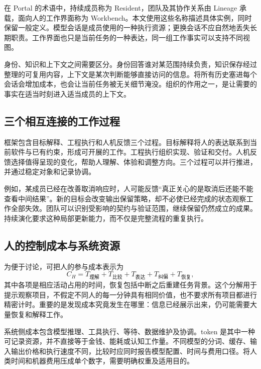 在 Portal 的术语中，持续成员称为 Resident，团队及其协作关系由 Lineage 承载，面向人的工作界面称为 Workbench。本文使用这些名称描述具体实例，同时保留一般定义。模型会话是成员使用的一种执行资源；更换会话不应自然地丢失长期职责。工作界面也只是当前任务的一种表达，同一组工作事实可以支持不同视图。

身份、知识和上下文之间需要区分。身份回答谁对某范围持续负责，知识保存经过整理的可复用内容，上下文是某次判断能够直接访问的信息。将所有历史塞进每个会话会增加成本，也会让当前任务被无关细节淹没。组织的作用之一，是让需要的事实在适当时刻进入适当成员的上下文。

\subsection{三个相互连接的工作过程}
框架包含目标解释、工程执行和人机反馈三个过程。目标解释将人的表达联系到当前软件与已有约束，形成可开展的工作。工程执行组织实现、验证和交付。人机反馈选择值得呈现的变化，帮助人理解、体验和调整方向。三个过程可以并行推进，并通过稳定对象和记录协调。

例如，某成员已经在改善取消响应时，人可能反馈“真正关心的是取消后还能不能查看中间结果”。新的目标会改变输出保留策略，却不必使已经完成的状态观察工作全部失效。团队可以识别受影响的契约与验证范围，继续保留仍然成立的成果。持续演化要求这种局部更新能力，而不仅是完整流程的重复执行。


\subsection{人的控制成本与系统资源}
为便于讨论，可把人的参与成本表示为
\begin{equation}
 C_H = T_{\text{理解}}+T_{\text{比较}}+T_{\text{表达}}+T_{\text{纠偏}}+T_{\text{恢复}},
\end{equation}
其中各项是相应活动占用的时间，恢复包括中断之后重建任务背景。这个分解用于提示观察项目，不假定不同人的每一分钟具有相同价值，也不要求所有项目都进行精密计时。重要的是发现成本究竟发生在哪里：信息已经展示出来，仍可能需要大量恢复和解释工作。

系统侧成本包含模型推理、工具执行、等待、数据维护及协调。token 是其中一种可记录资源，并不直接等于金钱、能耗或认知工作量。不同模型的分词、缓存、输入输出价格和执行速度不同，比较时应同时报告模型配置、时间与费用口径。将人类时间和机器费用压成单个数字，需要明确权重及适用目的。

